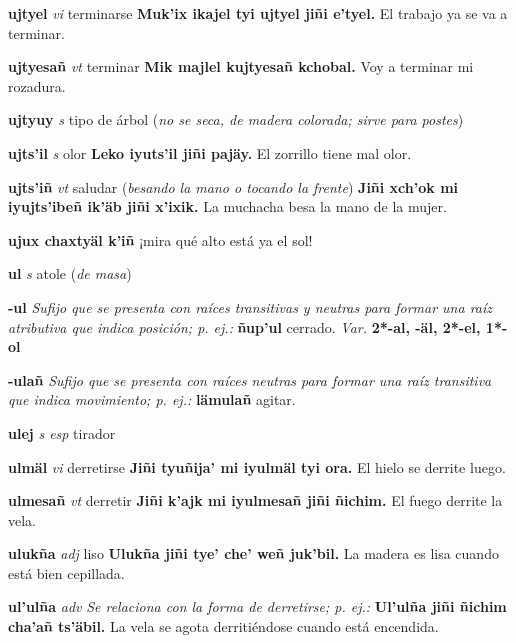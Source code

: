\documentclass[10pt]{scrbook}
\newcommand{\entry}[1]{\textbf{#1}}
\newcommand{\nontranslationdef}[1]{\textit{#1}}
\newcommand{\partofspeech}[1]{\textit{#1}}
\newcommand{\spanishtranslation}[1]{#1}
\newcommand{\clarification}[1]{(\textit{#1})}
\newcommand{\cholexample}[1]{\textbf{#1}}
\newcommand{\exampletranslation}[1]{#1}
\newcommand{\variation}[1]{\textit{Var.} \textbf{#1}}
\begin{document}
\begin{multicols}{2}
\entry{ujtyel}
\partofspeech{vi}
\spanishtranslation{terminarse}
\cholexample{Muk'ix ikajel tyi ujtyel jiñi e'tyel.}
\exampletranslation{El trabajo ya se va a terminar.}

\entry{ujtyesañ}
\partofspeech{vt}
\spanishtranslation{terminar}
\cholexample{Mik majlel kujtyesañ kchobal.}
\exampletranslation{Voy a terminar mi rozadura.}

\entry{ujtyuy}
\partofspeech{s}
\spanishtranslation{tipo de árbol}
\clarification{no se seca, de madera colorada; sirve para postes}

\entry{ujts'il}
\partofspeech{s}
\spanishtranslation{olor}
\cholexample{Leko iyuts'il jiñi pajäy.}
\exampletranslation{El zorrillo tiene mal olor.}

\entry{ujts'iñ}
\partofspeech{vt}
\spanishtranslation{saludar}
\clarification{besando la mano o tocando la frente}
\cholexample{Jiñi xch'ok mi iyujts'ibeñ ik'äb jiñi x'ixik.}
\exampletranslation{La muchacha besa la mano de la mujer.}

\entry{ujux chaxtyäl k'iñ}
\spanishtranslation{¡mira qué alto está ya el sol!}

\entry{ul}
\partofspeech{s}
\spanishtranslation{atole}
\clarification{de masa}

\entry{-ul}
\nontranslationdef{Sufijo que se presenta con raíces transitivas y neutras para formar una raíz atributiva que indica posición; p. ej.:}
\cholexample{ñup'ul}
\exampletranslation{cerrado.}
\variation{2*-al, -äl, 2*-el, 1*-ol}

\entry{-ulañ}
\nontranslationdef{Sufijo que se presenta con raíces neutras para formar una raíz transitiva que indica movimiento; p. ej.:}
\cholexample{lämulañ}
\exampletranslation{agitar.}

\entry{ulej}
\partofspeech{s esp}
\spanishtranslation{tirador}

\entry{ulmäl}
\partofspeech{vi}
\spanishtranslation{derretirse}
\cholexample{Jiñi tyuñija' mi iyulmäl tyi ora.}
\exampletranslation{El hielo se derrite luego.}

\entry{ulmesañ}
\partofspeech{vt}
\spanishtranslation{derretir}
\cholexample{Jiñi k'ajk mi iyulmesañ jiñi ñichim.}
\exampletranslation{El fuego derrite la vela.}

\entry{ulukña}
\partofspeech{adj}
\spanishtranslation{liso}
\cholexample{Ulukña jiñi tye' che' weñ juk'bil.}
\exampletranslation{La madera es lisa cuando está bien cepillada.}

\entry{ul'ulña}
\partofspeech{adv}
\nontranslationdef{Se relaciona con la forma de derretirse; p. ej.:}
\cholexample{Ul'ulña jiñi ñichim cha'añ ts'äbil.}
\exampletranslation{La vela se agota derritiéndose cuando está encendida.}


\end{multicols}
\end{document}
